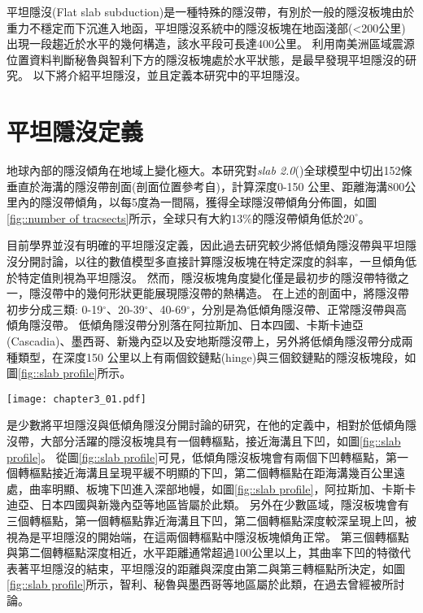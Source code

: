 平坦隱沒(Flat slab subduction)是一種特殊的隱沒帶，有別於一般的隱沒板塊由於重力不穩定而下沉進入地函，平坦隱沒系統中的隱沒板塊在地函淺部(<200公里)出現一段趨近於水平的幾何構造，該水平段可長達400公里。
\citealp{barazangi1976}利用南美洲區域震源位置資料判斷秘魯與智利下方的隱沒板塊處於水平狀態，是最早發現平坦隱沒的研究。
以下將介紹平坦隱沒，並且定義本研究中的平坦隱沒。

\section{平坦隱沒定義}\label{平坦隱沒定義}

地球內部的隱沒傾角在地域上變化極大。本研究對\textsl{slab 2.0}(\citealp{hayes2018slab2})全球模型中切出152條垂直於海溝的隱沒帶剖面(剖面位置參考自\citealp{Hu2020})，計算深度0-150 公里、距離海溝800公里內的隱沒帶傾角，以每5度為一間隔，獲得全球隱沒帶傾角分佈圖，如圖\ref{fig::number of tracsects}所示，全球只有大約$13\%$的隱沒帶傾角低於$20^\circ$。

目前學界並沒有明確的平坦隱沒定義，因此過去研究較少將低傾角隱沒帶與平坦隱沒分開討論，以往的數值模型多直接計算隱沒板塊在特定深度的斜率，一旦傾角低於特定值則視為平坦隱沒。
然而，隱沒板塊角度變化僅是最初步的隱沒帶特徵之一，隱沒帶中的幾何形狀更能展現隱沒帶的熱構造。
在上述的剖面中，將隱沒帶初步分成三類: 0-19$^\circ$、20-39$^\circ$、40-69$^\circ$，分別是為低傾角隱沒帶、正常隱沒帶與高傾角隱沒帶。
低傾角隱沒帶分別落在阿拉斯加、日本四國、卡斯卡迪亞(Cascadia)、墨西哥、新幾內亞以及安地斯隱沒帶上，\citealp{schellart2020control}另外將低傾角隱沒帶分成兩種類型，在深度150 公里以上有兩個鉸鏈點(hinge)與三個鉸鏈點的隱沒板塊段，如圖\ref{fig::slab profile}所示。

\begin{figure*}[ht!]
    \centering
    \texttt{[image: chapter3\_01.pdf]}
    \caption[全球$152$條隱沒帶剖面傾角長條分布圖]{全球$152$條隱沒帶剖面傾角長條分布圖，其中綠底為隱沒剖面傾角低於$20^\circ$的剖面個數，佔整體$13\%$;粉紅底為剖面傾角介於$20^\circ-39^\circ$之間的剖面個數，佔整體$73\%$，粉藍底則為剖面傾角高於$40^\circ$的剖面個數，佔總體$14\%$。}
    \label{fig::number of tracsects}
\end{figure*}

\citealp{schellart2020control}是少數將平坦隱沒與低傾角隱沒分開討論的研究，在他的定義中，相對於低傾角隱沒帶，大部分活躍的隱沒板塊具有一個轉樞點，接近海溝且下凹，如圖\ref{fig::slab profile}。
從圖\ref{fig::slab profile}可見，低傾角隱沒板塊會有兩個下凹轉樞點，第一個轉樞點接近海溝且呈現平緩不明顯的下凹，第二個轉樞點在距海溝幾百公里遠處，曲率明顯、板塊下凹進入深部地幔，如圖\ref{fig::slab profile}，阿拉斯加、卡斯卡迪亞、日本四國與新幾內亞等地區皆屬於此類。
另外在少數區域，隱沒板塊會有三個轉樞點，第一個轉樞點靠近海溝且下凹，第二個轉樞點深度較深呈現上凹，被視為是平坦隱沒的開始端，在這兩個轉樞點中隱沒板塊傾角正常。
第三個轉樞點與第二個轉樞點深度相近，水平距離通常超過100公里以上，其曲率下凹的特徵代表著平坦隱沒的結束，平坦隱沒的距離與深度由第二與第三轉樞點所決定，如圖\ref{fig::slab profile}所示，智利、秘魯與墨西哥等地區屬於此類，在過去曾經被\citealp{Manea2017}所討論。


